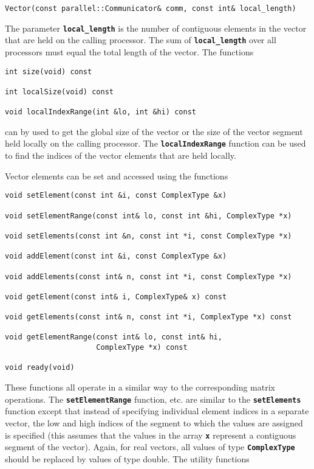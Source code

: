 {
\color{red}
\begin{Verbatim}[fontseries=b]
Vector(const parallel::Communicator& comm, const int& local_length)
\end{Verbatim}
}

The parameter \texttt{\textbf{local\_length}} is the number of contiguous elements in the vector that are held on the calling processor. The sum of \texttt{\textbf{local\_length}} over all processors must equal the total length of the vector. The functions

{
\color{red}
\begin{Verbatim}[fontseries=b]
int size(void) const

int localSize(void) const

void localIndexRange(int &lo, int &hi) const
\end{Verbatim}
}

can by used to get the global size of the vector or the size of the vector segment held locally on the calling processor. The \texttt{\textbf{localIndexRange}} function can be used to find the indices of the vector elements that are held locally.

Vector elements can be set and accessed using the functions

{
\color{red}
\begin{Verbatim}[fontseries=b]
void setElement(const int &i, const ComplexType &x)

void setElementRange(const int& lo, const int &hi, ComplexType *x)

void setElements(const int &n, const int *i, const ComplexType *x)

void addElement(const int &i, const ComplexType &x)

void addElements(const int& n, const int *i, const ComplexType *x)

void getElement(const int& i, ComplexType& x) const

void getElements(const int& n, const int *i, ComplexType *x) const

void getElementRange(const int& lo, const int& hi,
                     ComplexType *x) const

void ready(void)
\end{Verbatim}
}

These functions all operate in a similar way to the corresponding matrix operations. The \texttt{\textbf{setElementRange}} function, etc. are similar to the \texttt{\textbf{setElements}} function except that instead of specifying individual element indices in a separate vector, the low and high indices of the segment to which the values are assigned is specified (this assumes that the values in the array \texttt{\textbf{x}} represent a contiguous segment of the vector).  Again, for real vectors, all values of type \texttt{\textbf{ComplexType}} should be replaced by values of type double. The utility functions

